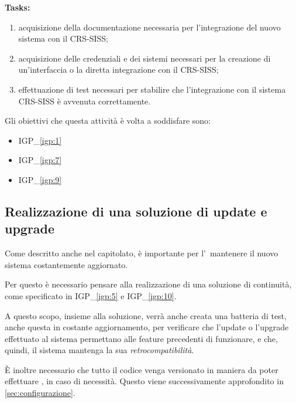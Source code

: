 		\textbf{Tasks:}
		\begin{enumerate}[noitemsep]
			\item acquisizione della documentazione necessaria per l'integrazione del nuovo sistema con il CRS-SISS;
			\item acquisizione delle credenziali e dei sistemi necessari per la creazione di un'interfaccia o la diretta integrazione con il CRS-SISS;
			\item effettuazione di test necessari per stabilire che l'integrazione con il sistema CRS-SISS è avvenuta correttamente.
		\end{enumerate}
	
		Gli obiettivi che questa attività è volta a soddisfare sono:
		\begin{itemize}[noitemsep]
			\renewcommand\labelitemi{--}
			\item {\color{pantone}IGP\_\ref{igp:1}}
			\item {\color{pantone}IGP\_\ref{igp:7}}
			\item {\color{pantone}IGP\_\ref{igp:9}}
		\end{itemize}	

	\newpage
	\subsection{Realizzazione di una soluzione di update e upgrade}
		
		Come descritto anche nel capitolato, è importante per l'\istituto~mantenere il nuovo sistema costantemente aggiornato.
		
		Per questo è necessario pensare alla realizzazione di una soluzione di continuità, come specificato in {\color{pantone}IGP\_\ref{igp:5}} e {\color{pantone}IGP\_\ref{igp:10}}.
		
		A questo scopo, insieme alla soluzione, verrà anche creata una batteria di test, anche questa in costante aggiornamento, per verificare che l'update o l'upgrade effettuato al sistema permettano alle feature precedenti di funzionare, e che, quindi, il sistema mantenga la sua \textit{retrocompatibilità}.
		
		È inoltre necessario che tutto il codice venga versionato in maniera da poter effettuare \rollback, in caso di necessità.
		Questo viene successivamente approfondito in \ref{sec:configurazione}.
		
